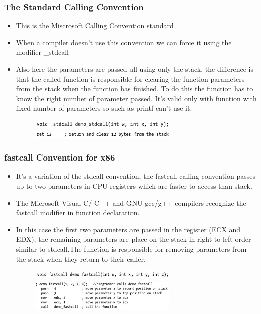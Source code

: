 \documentclass[]{beamer}
\begin{document}
\begin{frame}
  \frametitle{The Standard Calling Convention}
  \begin{itemize}
  \item{This is the Miscrosoft Calling Convention standard}
  \item{When a compiler doesn't use this convention we can force it using the modifier \color{red}\_stdcall}
  \item{Also here the parameters are passed all using only the stack, the difference  is that the called function is responsible for clearing the function parameters from the stack when the function has finished. To do this the function has to know the right number of parameter passed. It's valid only with function with fixed number of parameters so such as printf can't use it.}
    \begin{figure}
      \includegraphics[width=7cm]{images/demo_stdcall.eps}\\
      \includegraphics[width=7cm]{images/clear_stack.eps}
    \end{figure}
  \end{itemize}
\end{frame}
\begin{frame}
  \frametitle{fastcall Convention for x86}
  \begin{itemize}
  \item{It's a variation of the stdcall convention, the fastcall  calling convention passes up to two parameters in CPU registers which are faster to access than stack.}
  \item{The Microsoft Visual C/ C++ and GNU gcc/g++ compilers recognize the \color{red}fastcall\color{black} modifier in function declaration.}
  \item{In this case the first two parameters are passed in the register (ECX and EDX), the remaining parameters are place on the stack in right to left order similar to stdcall.The function is responsible for removing parameters from the stack when they return to their caller.}
    \begin{figure}
      \includegraphics[width=7cm]{images/demo_fastcall.eps}\\
      \includegraphics[width=7cm]{images/fastcall_place.eps}\\
    \end{figure}
  \end{itemize}
\end{frame}
\end{document}
